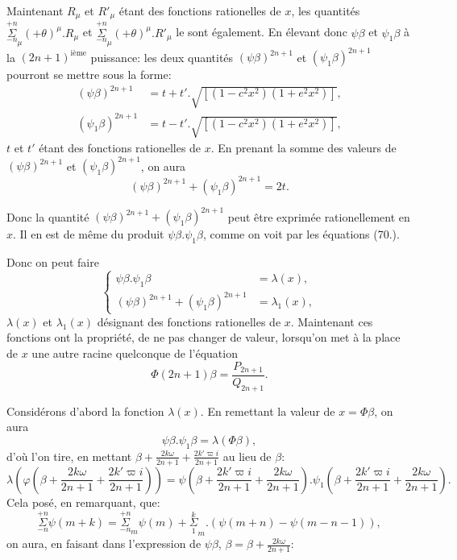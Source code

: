 \documentclass{article}
\begin{document}
Maintenant $R_{\mu}$ et $R'_{\mu}$ étant des fonctions rationelles de $x$, les quantités $\overset{+n}{\underset{-n}{\Sigma}}_{\mu}(+\theta)^{\mu}.R_{\mu}$ et $\overset{+n}{\underset{-n}{\Sigma}}_{\mu}(+\theta)^{\mu}.R'_{\mu}$ le sont également. En élevant donc $\psi\beta$ et $\psi_{1}\beta$ à la $(2n+1)^{\text{ième}}$ puissance: les deux quantités $(\psi\beta)^{2n+1}$ et $(\psi_{1}\beta)^{2n+1}$ pourront se mettre sous la forme:
\[ \begin{aligned}
(\psi\beta)^{2n+1}&=t+t'.\sqrt{[(1-c^{2}x^{2})(1+e^{2}x^{2})]},\\
(\psi_{1}\beta)^{2n+1}&=t-t'.\sqrt{[(1-c^{2}x^{2})(1+e^{2}x^{2})]},
\end{aligned} \]
$t$ et $t'$ étant des fonctions rationelles de $x$. En prenant la somme des valeurs de $(\psi\beta)^{2n+1}$ et $(\psi_{1}\beta)^{2n+1}$, on aura
\[ (\psi\beta)^{2n+1}+(\psi_{1}\beta)^{2n+1}=2t. \]

Donc la quantité $(\psi\beta)^{2n+1}+(\psi_{1}\beta)^{2n+1}$ peut être exprimée rationellement en $x$. Il en est de même du produit $\psi\beta.\psi_{1}\beta$, comme on voit par les équations (70.).

Donc on peut faire
\[ \left\{\begin{aligned}
\psi\beta.\psi_{1}\beta&=\lambda(x),\\
(\psi\beta)^{2n+1}+(\psi_{1}\beta)^{2n+1}&=\lambda_{1}(x),
\end{aligned}\right. \tag{71.} \]
$\lambda(x)$ et $\lambda_{1}(x)$ désignant des fonctions rationelles de $x$. Maintenant ces fonctions ont la propriété, de ne pas changer de valeur, lorsqu'on met à la place de $x$ une autre racine quelconque de l'équation
\[ \Phi(2n+1)\beta=\frac{P_{2n+1}}{Q_{2n+1}}. \]

Considérons d'abord la fonction $\lambda(x)$. En remettant la valeur de $x=\Phi\beta$, on aura
\[ \psi\beta.\psi_{1}\beta=\lambda(\Phi\beta), \]
d'où l'on tire, en mettant $\beta+\frac{2k\omega}{2n+1}+\frac{2k'\varpi i}{2n+1}$ au lieu de $\beta$:
\[ \lambda\left(\varphi\left(\beta+\frac{2k\omega}{2n+1}+\frac{2k'\varpi i}{2n+1}\right)\right)=\psi\left(\beta+\frac{2k'\varpi i}{2n+1}+\frac{2k\omega}{2n+1}\right).\psi_{1}\left(\beta+\frac{2k'\varpi i}{2n+1}+\frac{2k\omega}{2n+1}\right). \]
Cela posé, en remarquant, que:
\[ \overset{+n}{\underset{-n}{\Sigma}}\psi(m+k)=\overset{+n}{\underset{-n}{\Sigma}}_{m}\psi(m)+\overset{k}{\underset{1}{\Sigma}}_{m}.(\psi(m+n)-\psi(m-n-1)), \tag{72.} \]
on aura, en faisant dans l'expression de $\psi\beta$, $\beta=\beta+\frac{2k\omega}{2n+1}$:
\end{document}
